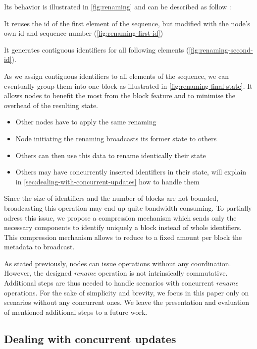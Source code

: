 \documentclass[sigplan,10pt]{acmart}
\begin{document}
Its behavior is illustrated in \autoref{fig:renaming} and can be described as follow :
\begin{enumerate*}
    \item It reuses the id of the first element of the sequence, but modified with the node's own id and sequence number (\autoref{fig:renaming-first-id})
    \item It generates contiguous identifiers for all following elements (\autoref{fig:renaming-second-id}).
\end{enumerate*}
As we assign contiguous identifiers to all elements of the sequence, we can eventually group them into one block as illustrated in \autoref{fig:renaming-final-state}.
It allows nodes to benefit the most from the block feature and to minimise the overhead of the resulting state.

\begin{itemize}
    \item Other nodes have to apply the same renaming
    \item Node initiating the renaming broadcasts its former state to others
    \item Others can then use this data to rename identically their state
    \item Others may have concurrently inserted identifiers in their state, will explain in \autoref{sec:dealing-with-concurrent-updates} how to handle them
\end{itemize}


Since the size of identifiers and the number of blocks are not bounded, broadcasting this operation may end up quite bandwidth consuming.
To partially adress this issue, we propose a compression mechanism which sends only the necessary components to identify uniquely a block instead of whole identifiers.
This compression mechanism allows to reduce to a fixed amount per block the metadata to broadcast.

As stated previously, nodes can issue operations without any coordination.
However, the designed \emph{rename} operation is not intrinsically commutative.
Additional steps are thus needed to handle scenarios with concurrent \emph{rename} operations.
For the sake of simplicity and brevity, we focus in this paper only on scenarios without any concurrent ones.
We leave the presentation and evaluation of mentioned additional steps to a future work.

\subsection{Dealing with concurrent updates}
\end{document}
